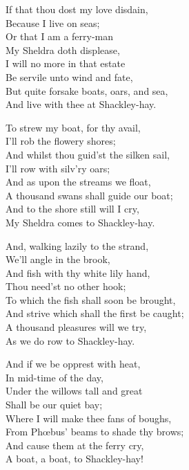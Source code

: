\begin{dcverse}\begin{patverse}
If that thou dost my love disdain,\\
Because I live on seas;\\
Or that I am a ferry-man\\
My Sheldra doth displease,\\
I will no more in that estate\\
Be servile unto wind and fate,\\
But quite forsake boats, oars, and sea,\\
And live with thee at Shackley-hay.
\end{patverse}

\begin{patverse}
To strew my boat, for thy avail,\\
I’ll rob the flowery shores;\\
And whilst thou guid’st the silken sail,\\
I’ll row with silv’ry oars;\\
And as upon the streams we float,\\
A thousand swans shall guide our boat;\\
And to the shore still will I cry,\\
My Sheldra comes to Shackley-hay.
\end{patverse}

\begin{patverse}
And, walking lazily to the strand,\\
We’ll angle in the brook,\\
And fish with thy white lily hand,\\
Thou need’st no other hook;\\
To which the fish shall soon be brought,\\
And strive which shall the first be caught;\\
A thousand pleasures will we try,\\
As we do row to Shackley-hay.

\end{patverse}
\begin{patverse}
And if we be opprest with heat,\\
In mid-time of the day,\\
Under the willows tall and great\\
Shall be our quiet bay;\\
Where I will make thee fans of boughs,\\
From Phœbus’ beams to shade thy brows;\\
And cause them at the ferry cry,\\
A boat, a boat, to Shackley-hay!
\end{patverse}


\end{dcverse}
